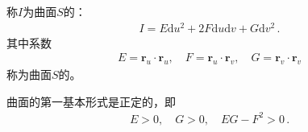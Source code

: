 \begin{definition}
    称$I$为曲面$S$的：
    \begin{align}\label{eq:03ex01.22}
        I=E\mathrm{d}u^2+2F\mathrm{d}u\mathrm{d}v+G\mathrm{d}v^2\, .
    \end{align}
    其中系数
    \begin{align}\label{eq:03ex01.23}
        E=\bm r_u\cdot\bm r_u,\quad F=\bm r_u\cdot\bm r_v,\quad G=\bm r_v\cdot\bm r_v
    \end{align}
    称为曲面$S$的。
\end{definition}

\begin{corollary}
    曲面的第一基本形式是正定的，即
    \begin{align}\label{eq:03ex01.24}
        E>0,\quad G>0,\quad EG-F^2>0\, .
    \end{align}
\end{corollary}
